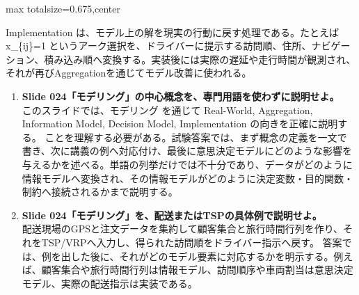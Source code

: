 \begin{adjustbox}{max totalsize={\textwidth}{0.675\textheight},center}
\begin{minipage}{\textwidth}
\begin{minipage}[t]{0.485\textwidth}
Implementation は、モデル上の解を現実の行動に戻す処理である。たとえば x\_\{ij\}=1 というアーク選択を、ドライバーに提示する訪問順、住所、ナビゲーション、積み込み順へ変換する。実装後には実際の遅延や走行時間が観測され、それが再びAggregationを通じてモデル改善に使われる。\par
{}
\begin{enumerate}
\item \textbf{Slide 024「モデリング」の中心概念を、専門用語を使わずに説明せよ。}\\このスライドでは、モデリング を通じて Real-World, Aggregation, Information Model, Decision Model, Implementation の向きを正確に説明する。 ことを理解する必要がある。試験答案では、まず概念の定義を一文で書き、次に講義の例へ対応付け、最後に意思決定モデルにどのような影響を与えるかを述べる。単語の列挙だけでは不十分であり、データがどのように情報モデルへ変換され、その情報モデルがどのように決定変数・目的関数・制約へ接続されるかまで説明する。
\item \textbf{Slide 024「モデリング」を、配送またはTSPの具体例で説明せよ。}\\配送現場のGPSと注文データを集約して顧客集合と旅行時間行列を作り、それをTSP/VRPへ入力し、得られた訪問順をドライバー指示へ戻す。 答案では、例を出した後に、それがどのモデル要素に対応するかを明示する。例えば、顧客集合や旅行時間行列は情報モデル、訪問順序や車両割当は意思決定モデル、実際の配送指示は実装である。
\end{enumerate}
\end{minipage}
\end{minipage}
\end{adjustbox}

